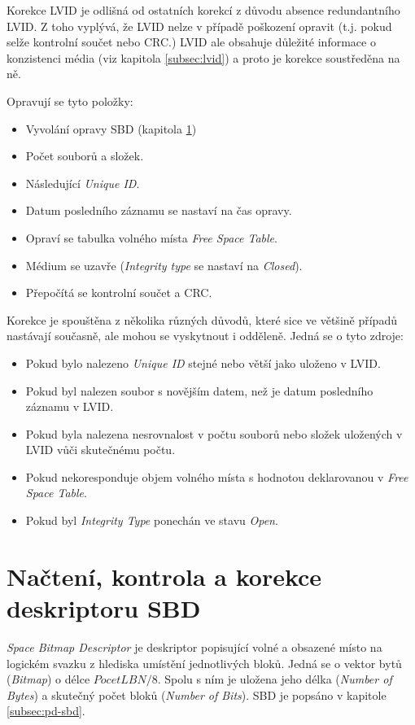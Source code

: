 Korekce LVID je odlišná od ostatních korekcí z důvodu absence redundantního LVID. Z toho vyplývá, že LVID nelze v případě poškození opravit (t.j. pokud selže kontrolní součet nebo CRC.) LVID ale obsahuje důležité informace o konzistenci média (viz kapitola \ref{subsec:lvid}) a proto je korekce soustředěna na ně.

Opravují se tyto položky:
\begin{itemize}
    \item Vyvolání opravy SBD (kapitola \ref{sec:nacteni-a-oprava-sbd})
    \item Počet souborů a složek.
    \item Následující \textit{Unique ID}.
    \item Datum posledního záznamu se nastaví na čas opravy.
    \item Opraví se tabulka volného místa \textit{Free Space Table}.
    \item Médium se uzavře (\textit{Integrity type} se nastaví na \textit{Closed}).
    \item Přepočítá se kontrolní součet a CRC.
\end{itemize}
Korekce je spouštěna z několika různých důvodů, které sice ve většině případů nastávají současně, ale mohou se vyskytnout i odděleně. Jedná se o tyto zdroje:
\begin{itemize}
    \item Pokud bylo nalezeno \textit{Unique ID} stejné nebo větší jako uloženo v LVID.
    \item Pokud byl nalezen soubor s novějším datem, než je datum posledního záznamu v LVID.
    \item Pokud byla nalezena nesrovnalost v počtu souborů nebo složek uložených v LVID vůči skutečnému počtu.
    \item Pokud nekoresponduje objem volného místa s hodnotou deklarovanou v \textit{Free Space Table}.
    \item Pokud byl \textit{Integrity Type} ponechán ve stavu \textit{Open}.
\end{itemize}

\section{Načtení, kontrola a korekce deskriptoru SBD}
\label{sec:nacteni-a-oprava-sbd}
\textit{Space Bitmap Descriptor} je deskriptor popisující volné a obsazené místo na logickém svazku z hlediska umístění jednotlivých bloků. Jedná se o vektor bytů (\textit{Bitmap}) o délce $PocetLBN / 8$. Spolu s ním je uložena jeho délka (\textit{Number of Bytes}) a skutečný počet bloků (\textit{Number of Bits}). SBD je popsáno v kapitole \ref{subsec:pd-sbd}.
 
